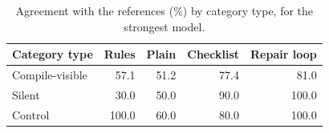 \begin{table}[t]
\centering
\caption{Agreement with the references (\%) by category type, for the strongest model.}
\label{tab:observability}
\footnotesize
\begin{tabular}{lrrrr}
\toprule
Category type & Rules & Plain & Checklist & Repair loop \\
\midrule
Compile-visible & 57.1 & 51.2 & 77.4 & 81.0 \\
Silent & 30.0 & 50.0 & 90.0 & 100.0 \\
Control & 100.0 & 60.0 & 80.0 & 100.0 \\
\bottomrule
\end{tabular}
\end{table}
